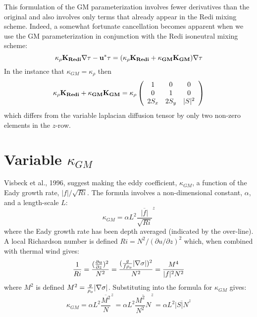 \documentclass[12pt]{article}
\begin{document}
This formulation of the GM parameterization involves fewer derivatives
than the original and also involves only terms that already appear in
the Redi mixing scheme. Indeed, a somewhat fortunate cancellation
becomes apparent when we use the GM parameterization in conjunction
with the Redi isoneutral mixing scheme:
\begin{equation}
\kappa_\rho \bf{K}_{Redi} \bf{\nabla} \tau
- u^* \tau = 
( \kappa_\rho \bf{K}_{Redi} + \kappa_{GM} \bf{K}_{GM} ) \bf{\nabla} \tau
\end{equation}
In the instance that $\kappa_{GM} = \kappa_{\rho}$ then
\begin{equation}
\kappa_\rho \bf{K}_{Redi} + \kappa_{GM} \bf{K}_{GM} =
\kappa_\rho
\left( \begin{array}{ccc}
1 & 0 & 0 \\
0 & 1 & 0 \\
2 S_x & 2 S_y & |S|^2 
\end{array}
\right)
\end{equation}
which differs from the variable laplacian diffusion tensor by only
two non-zero elements in the $z$-row.

\section{Variable $\kappa_{GM}$}

Visbeck et al., 1996, suggest making the eddy coefficient,
$\kappa_{GM}$, a function of the Eady growth rate,
$|f|/\sqrt{Ri}$. The formula involves a non-dimensional constant,
$\alpha$, and a length-scale $L$:
\begin{displaymath}
\kappa_{GM} = \alpha L^2 \overline{ \frac{|f|}{\sqrt{Ri}} }^z
\end{displaymath}
where the Eady growth rate has been depth averaged (indicated by the
over-line). A local Richardson number is defined $Ri = N^2 / (\partial
u/\partial z)^2$ which, when combined with thermal wind gives:
\begin{displaymath}
\frac{1}{Ri} = \frac{(\frac{\partial u}{\partial z})^2}{N^2} =
\frac{ ( \frac{g}{f \rho_o} | {\bf \nabla} \sigma | )^2 }{N^2} =
\frac{ M^4 }{ |f|^2 N^2 }
\end{displaymath}
where $M^2$ is defined $M^2 = \frac{g}{\rho_o} |{\bf \nabla} \sigma|$.
Substituting into the formula for $\kappa_{GM}$ gives:
\begin{displaymath}
\kappa_{GM} = \alpha L^2 \overline{ \frac{M^2}{N} }^z =
\alpha L^2 \overline{ \frac{M^2}{N^2} N }^z =
\alpha L^2 \overline{ |S| N }^z
\end{displaymath}
\end{document}
